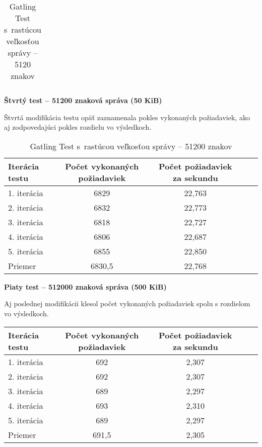 \documentclass[12pt,oneside,final]{fithesis-utf8}
\begin{document}
\begin{itemize}
\begin{table}[H]
\begin{center}
\begin{tabular}{ | l | c | c | c | c |}
\end{tabular}
\end{center}
\caption{Gatling Test s~rastúcou veľkosťou správy -- 5120 znakov}
\end{table}


\textbf{Štvrtý test -- 51200 znaková správa (50 KiB)}

Štvrtá modifikácia testu opäť zaznamenala pokles vykonaných požiadaviek, ako aj zodpovedajúci pokles rozdielu vo výsledkoch.

\begin{table}[H]
\begin{center}
\begin{tabular}{ | l | c | c | c | c |}
		\hline
		 \textbf{Iterácia testu} & \textbf{Počet vykonaných požiadaviek} & \textbf{Počet požiadaviek za sekundu} \\ \hline
		 1. iterácia & 6829 & 22,763 \\ \hline
		 2. iterácia & 6832 & 22,773 \\ \hline
		 3. iterácia & 6818 & 22,727 \\ \hline
		 4. iterácia & 6806 & 22,687 \\ \hline
		 5. iterácia & 6855 & 22,850 \\ \hline
		 Priemer & 6830,5 & 22,768 \\ \hline
		 
\end{tabular}
\end{center}
\caption{Gatling Test s~rastúcou veľkosťou správy -- 51200 znakov}
\end{table}


\textbf{Piaty test -- 512000 znaková správa (500 KiB)}

Aj poslednej modifikácii klesol počet vykonaných požiadaviek spolu s rozdielom vo výsledkoch.

\begin{table}[H]
\begin{center}
\begin{tabular}{ | l | c | c | c | c |}
		\hline
		 \textbf{Iterácia testu} & \textbf{Počet vykonaných požiadaviek} & \textbf{Počet požiadaviek za sekundu} \\ \hline
		 1. iterácia & 692 & 2,307 \\ \hline
		 2. iterácia & 692 & 2,307 \\ \hline
		 3. iterácia & 689 & 2,297 \\ \hline
		 4. iterácia & 693 & 2,310 \\ \hline
		 5. iterácia & 689 & 2,297 \\ \hline
		 Priemer & 691,5 & 2,305 \\ \hline
		 

\end{tabular}
\end{center}
\end{table}
\end{itemize}
\end{document}
